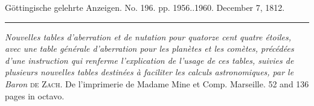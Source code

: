 \clearpage
{}
\hypertarget{native-551-lower}{}\label{native-551-lower}
\begin{center}\small Göttingische gelehrte Anzeigen. No. 196. pp. 1956..1960. December 7, 1812.\\[3pt]\rule{.72\linewidth}{.3pt}\end{center}

\emph{Nouvelles tables d'aberration et de nutation pour quatorze cent quatre étoiles, avec une table générale d'aberration pour les planètes et les comètes, précédées d'une instruction qui renferme l'explication de l'usage de ces tables, suivies de plusieurs nouvelles tables destinées à faciliter les calculs astronomiques, par le Baron} \textsc{de Zach}. De l'imprimerie de Madame Mine et Comp. Marseille. 52 and 136 pages in octavo.

